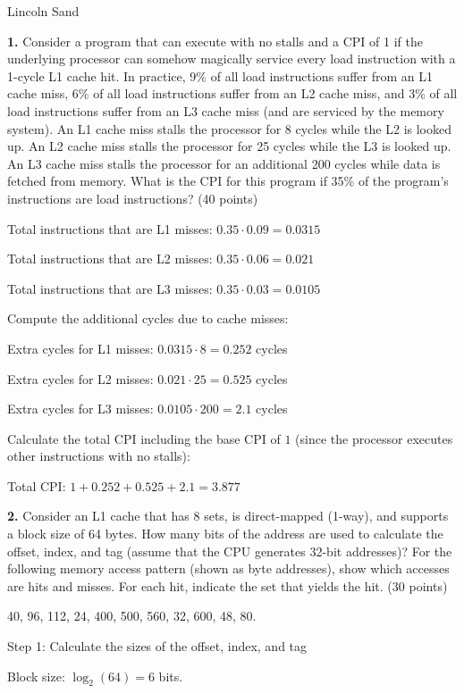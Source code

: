 \documentclass{article}
\begin{document}
\Large{Lincoln Sand}


\textbf{1.} Consider a program that can execute with no stalls and a CPI of 1
if the underlying processor can somehow magically service every load
instruction with a 1-cycle L1 cache hit. In practice, 9\% of all load
instructions suffer from an L1 cache miss, 6\% of all load instructions
suffer from an L2 cache miss, and 3\% of all load instructions suffer
from an L3 cache miss (and are serviced by the memory system).
An L1 cache miss stalls the processor for 8 cycles while the L2
is looked up. An L2 cache miss stalls the processor for 25 cycles
while the L3 is looked up. An L3 cache miss stalls the processor
for an additional 200 cycles while data is fetched from memory.
What is the CPI for this program if 35\% of the program's instructions
are load instructions? (40 points) 

Total instructions that are L1 misses: $0.35 \cdot 0.09 = 0.0315$

Total instructions that are L2 misses: $0.35 \cdot 0.06 = 0.021$

Total instructions that are L3 misses: $0.35 \cdot 0.03 = 0.0105$

Compute the additional cycles due to cache misses:

Extra cycles for L1 misses: $0.0315 \cdot 8 = 0.252$ cycles

Extra cycles for L2 misses: $0.021 \cdot 25 = 0.525$ cycles

Extra cycles for L3 misses: $0.0105 \cdot 200 = 2.1$ cycles

Calculate the total CPI including the base CPI of $1$ (since
the processor executes other instructions with no stalls):

Total CPI: $1 + 0.252 + 0.525 + 2.1 = 3.877$

\newpage

\textbf{2.} Consider an L1 cache that has 8 sets, is direct-mapped
(1-way), and supports a block size of 64 bytes. How many bits of
the address are used to calculate the offset, index, and tag
(assume that the CPU generates 32-bit addresses)? For the
following memory access pattern (shown as byte addresses),
show which accesses are hits and misses. For each hit,
indicate the set that yields the hit. (30 points) 

40, 96, 112, 24, 400, 500, 560, 32, 600, 48, 80.

Step 1: Calculate the sizes of the offset, index, and tag

Block size: $\log_2(64) = 6$ bits.
\end{document}
